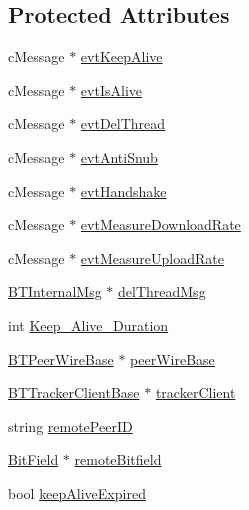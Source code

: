 \subsection*{Protected Attributes}
\begin{DoxyCompactItemize}
\item 
c\+Message $\ast$ \hyperlink{classBTPeerWireClientHandlerBase_acc55d5d39f7e06fddf77549a2ff67425}{evt\+Keep\+Alive}
\item 
c\+Message $\ast$ \hyperlink{classBTPeerWireClientHandlerBase_af55d524d592c461ad71a8dc78a6d2e3f}{evt\+Is\+Alive}
\item 
c\+Message $\ast$ \hyperlink{classBTPeerWireClientHandlerBase_a3aa244b8caf784fe747e8b03c61fdac5}{evt\+Del\+Thread}
\item 
c\+Message $\ast$ \hyperlink{classBTPeerWireClientHandlerBase_a854d68cbbdfe22cf59c70ef1a9cfa617}{evt\+Anti\+Snub}
\item 
c\+Message $\ast$ \hyperlink{classBTPeerWireClientHandlerBase_a72c99108037fa5ea8de8b5a740e3d2b2}{evt\+Handshake}
\item 
c\+Message $\ast$ \hyperlink{classBTPeerWireClientHandlerBase_a12f19b014b30e6c89834d85c8bca6817}{evt\+Measure\+Download\+Rate}
\item 
c\+Message $\ast$ \hyperlink{classBTPeerWireClientHandlerBase_adf45936c09a11f77717abd07f411b1e7}{evt\+Measure\+Upload\+Rate}
\item 
\hyperlink{classBTInternalMsg}{B\+T\+Internal\+Msg} $\ast$ \hyperlink{classBTPeerWireClientHandlerBase_aee618de4f918135adb2da435da4f1424}{del\+Thread\+Msg}
\item 
int \hyperlink{classBTPeerWireClientHandlerBase_a053d029148653ba1451f3f2d6513e303}{Keep\+\_\+\+Alive\+\_\+\+Duration}
\item 
\hyperlink{classBTPeerWireBase}{B\+T\+Peer\+Wire\+Base} $\ast$ \hyperlink{classBTPeerWireClientHandlerBase_a159b67e530160916c78fa72be86f97b6}{peer\+Wire\+Base}
\item 
\hyperlink{classBTTrackerClientBase}{B\+T\+Tracker\+Client\+Base} $\ast$ \hyperlink{classBTPeerWireClientHandlerBase_a9c42f83915497b67123ae9232b2ddae5}{tracker\+Client}
\item 
string \hyperlink{classBTPeerWireClientHandlerBase_aafa0a0277ea273ceb2c625135bf57857}{remote\+Peer\+I\+D}
\item 
\hyperlink{classBitField}{Bit\+Field} $\ast$ \hyperlink{classBTPeerWireClientHandlerBase_ac1884399611a6d8814c30ed73d71371e}{remote\+Bitfield}
\item 
bool \hyperlink{classBTPeerWireClientHandlerBase_ab0f5e70d2b13f138ef9f87a1c272d439}{keep\+Alive\+Expired}

\end{DoxyCompactItemize}
